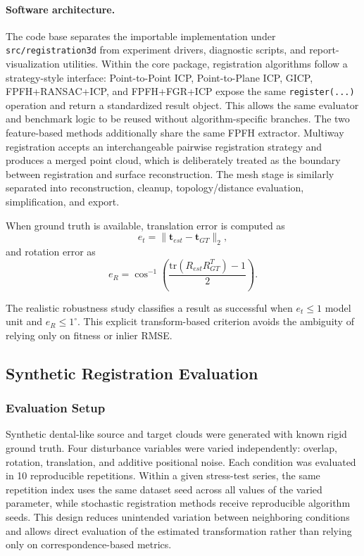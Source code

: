 \paragraph{Software architecture.}
The code base separates the importable implementation under \texttt{src/registration3d} from experiment drivers, diagnostic scripts, and report-visualization utilities. Within the core package, registration algorithms follow a strategy-style interface: Point-to-Point ICP, Point-to-Plane ICP, GICP, FPFH+RANSAC+ICP, and FPFH+FGR+ICP expose the same \texttt{register(...)} operation and return a standardized result object. This allows the same evaluator and benchmark logic to be reused without algorithm-specific branches. The two feature-based methods additionally share the same FPFH extractor. Multiway registration accepts an interchangeable pairwise registration strategy and produces a merged point cloud, which is deliberately treated as the boundary between registration and surface reconstruction. The mesh stage is similarly separated into reconstruction, cleanup, topology/distance evaluation, simplification, and export.

\begin{samepage}
When ground truth is available, translation error is computed as
\begin{equation}
    e_t = \lVert \mathbf{t}_{est} - \mathbf{t}_{GT} \rVert_2,
\end{equation}
and rotation error as
\begin{equation}
    e_R = \cos^{-1}\left(\frac{\mathrm{tr}(R_{est}R_{GT}^{T})-1}{2}\right).
\end{equation}
\end{samepage}
The realistic robustness study classifies a result as successful when $e_t\leq1$ model unit and $e_R\leq1^\circ$. This explicit transform-based criterion avoids the ambiguity of relying only on fitness or inlier RMSE.

\subsection{Synthetic Registration Evaluation}
\label{sec:marvin-synthetic-registration}

\subsubsection{Evaluation Setup}

Synthetic dental-like source and target clouds were generated with known rigid ground truth. Four disturbance variables were varied independently: overlap, rotation, translation, and additive positional noise. Each condition was evaluated in 10 reproducible repetitions. Within a given stress-test series, the same repetition index uses the same dataset seed across all values of the varied parameter, while stochastic registration methods receive reproducible algorithm seeds. This design reduces unintended variation between neighboring conditions and allows direct evaluation of the estimated transformation rather than relying only on correspondence-based metrics.

